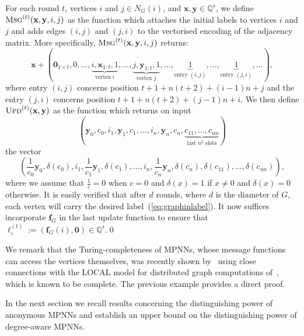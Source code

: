 \begin{example}
For each round $t$, vertices $i$ and $j\in N_G(i)$, and $\mathbf{x},\mathbf{y}\in\mathbb{Q}^s$, we define
$
\textsc{Msg}^{(t)}(\mathbf{x},\mathbf{y},i,j)
$
as the function which attaches the initial labels to vertices $i$ and $j$ and adds edges $(i,j)$ and $(j,i)$ to the vectorised encoding of the adjacency matrix.
More specifically, $
\textsc{Msg}^{(t)}(\mathbf{x},\mathbf{y},i,j)
$ returns:
$$
\mathbf{x}+(\mathbf{0}_{1\times t},0,\ldots,\underbrace{i,\mathbf{x}_{1:t},1}_{\text{vertex $i$}},\ldots, \underbrace{j,\mathbf{y}_{1:t},1}_{\text{vertex $j$}},\ldots,\underbrace{1}_{\text{entry $(i,j)$}},\ldots,\underbrace{1}_{\text{entry $(j,i)$}},\ldots),
$$
where entry $(i,j)$ concerns position $t+1+n(t+2)+(i-1)n+j$ and the entry $(j,i)$
concerns position $t+1+n(t+2)+(j-1)n+i$. We then define
$\textsc{Upd}^{(t)}(\mathbf{x},\mathbf{y})$ as the
function which returns on input 
$$
(\mathbf{y}_0,c_0,i_1,\mathbf{y}_1,c_1,\ldots,i_n,\mathbf{y}_n,c_n, \underbrace{c_{11},\ldots,c_{nn}}_{\text{last $n^2$ slots}})
$$
the vector
$$
(\frac{1}{c_0}\mathbf{y}_0,\delta(c_0),i_1,\frac{1}{c_1}\mathbf{y}_1,\delta(c_1),\ldots,
i_n,\frac{1}{c_n}\mathbf{y}_n,\delta(c_n),\delta(c_{11}),\ldots,\delta(c_{nn})),
$$
where we assume that $\frac{1}{c}=0$ when $c=0$ and $\delta(x)=1$ if $x\neq 0$ and $\delta(x)=0$ otherwise. It is easily verified that after $d$ rounds, where $d$ is the diameter of $G$, each vertex will carry
the desired label~(\ref{eq:graphinlabel}). It now suffices incorporate $\mathbf{f}_G$ in the last update function to ensure that $\pmb{\ell}_i^{(t)}:=(\mathbf{f}_G(i),\mathbf{0})\in\mathbb{Q}^s$.\qed
\end{example}
We remark that the Turing-completeness of MPNNs, whose message functions can access  the vertices themselves, was recently shown by~\cite{Loukas2019}  using close connections with the LOCAL model for distributed graph computations of~\cite{Angluin}, which is known to be complete. The previous example provides a direct proof.

In the next section we recall results concerning the distinguishing power of anonymous MPNNs and establish an upper bound on the distinguishing power of degree-aware MPNNs.

